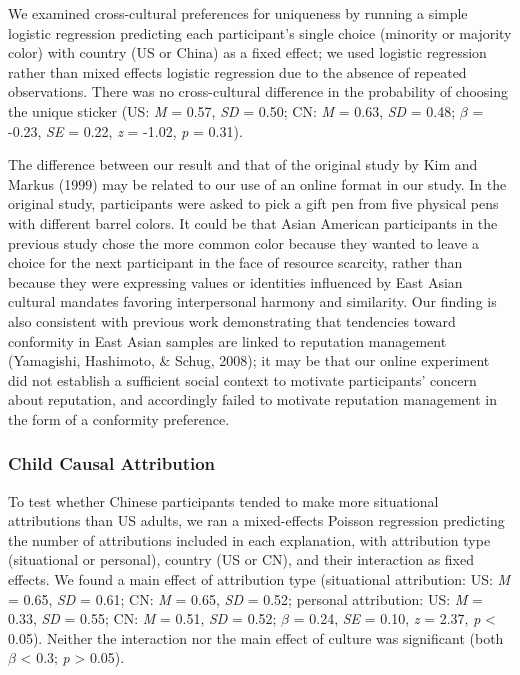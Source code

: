 \documentclass[
  man,floatsintext]{apa6}
\begin{document}
We examined cross-cultural preferences for uniqueness by running a simple logistic regression predicting each participant's single choice (minority or majority color) with country (US or China) as a fixed effect; we used logistic regression rather than mixed effects logistic regression due to the absence of repeated observations. There was no cross-cultural difference in the probability of choosing the unique sticker (US: \emph{M} = 0.57, \emph{SD} = 0.50; CN: \emph{M} = 0.63, \emph{SD} = 0.48; \(\beta\) = -0.23, \emph{SE} = 0.22, \emph{z} = -1.02, \emph{p} = 0.31).

The difference between our result and that of the original study by Kim and Markus (1999) may be related to our use of an online format in our study. In the original study, participants were asked to pick a gift pen from five physical pens with different barrel colors. It could be that Asian American participants in the previous study chose the more common color because they wanted to leave a choice for the next participant in the face of resource scarcity, rather than because they were expressing values or identities influenced by East Asian cultural mandates favoring interpersonal harmony and similarity. Our finding is also consistent with previous work demonstrating that tendencies toward conformity in East Asian samples are linked to reputation management (Yamagishi, Hashimoto, \& Schug, 2008); it may be that our online experiment did not establish a sufficient social context to motivate participants' concern about reputation, and accordingly failed to motivate reputation management in the form of a conformity preference.

\hypertarget{child-causal-attribution-1}{%
\subsubsection{Child Causal Attribution}\label{child-causal-attribution-1}}

To test whether Chinese participants tended to make more situational attributions than US adults, we ran a mixed-effects Poisson regression predicting the number of attributions included in each explanation, with attribution type (situational or personal), country (US or CN), and their interaction as fixed effects. We found a main effect of attribution type (situational attribution: US: \emph{M} = 0.65, \emph{SD} = 0.61; CN: \emph{M} = 0.65, \emph{SD} = 0.52; personal attribution: US: \emph{M} = 0.33, \emph{SD} = 0.55; CN: \emph{M} = 0.51, \emph{SD} = 0.52; \(\beta\) = 0.24, \emph{SE} = 0.10, \emph{z} = 2.37, \emph{p} \textless{} 0.05). Neither the interaction nor the main effect of culture was significant (both \(\beta\) \textless{} 0.3; \emph{p} \textgreater{} 0.05).
\end{document}
